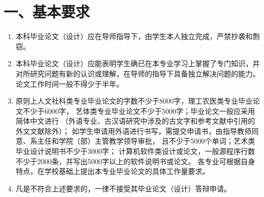 \section*{一、基本要求}
\begin{enumerate}
  \item 本科毕业论文（设计）应在导师指导下，由学生本人独立完成，严禁抄袭和剽窃。
  \item 本科毕业论文（设计）应能表明学生确已在本专业学习上掌握了专门知识，并对所研究问题有新的认识或理解，在导师的指导下具备独立解决问题的能力。论文工作时间一般不得少于半年。
  \item 原则上人文社科类专业毕业论文的字数不少于8000字，理工农医类专业毕业论文不少于6000字，%
  艺体类专业毕业论文不少于5000字；毕业论文一般应采用简体中文进行%
  （外语专业、古汉语研究中涉及的古文字和参考文献中引用的外文文献除外）；%
  如学生申请用外语进行书写，需提交申请书，由指导教师同意、系主任和学院（部）主管教学领导审批，%
  且不少于5000个单词；艺术类毕业设计说明书不少于3000字；%
  计算机软件类设计或论文，一般源程序行数不少于2000条，并写出5000字以上的软件说明书或论文。%
  各专业可根据自身特点，在学校基础上提出本专业毕业论文的具体工作量要求。
  \item 凡是不符合上述要求的，一律不接受其毕业论文（设计）答辩申请。
\end{enumerate}

